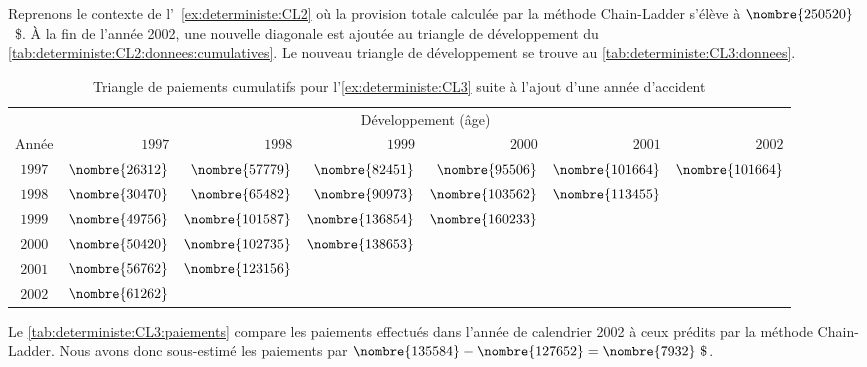 \begin{exemple}
  \label{ex:deterministe:CL3}
  Reprenons le contexte de l'~\autoref{ex:deterministe:CL2} où la
  provision totale calculée par la méthode Chain-Ladder s'élève à
  $\nombre{250520}$~\$. À la fin de l'année 2002, une nouvelle
  diagonale est ajoutée au triangle de développement du
  \autoref{tab:deterministe:CL2:donnees:cumulatives}. Le nouveau
  triangle de développement se trouve au
  \autoref{tab:deterministe:CL3:donnees}.

  \begin{table}
    \centering
    \caption{Triangle de paiements cumulatifs pour
      l'\autoref{ex:deterministe:CL3} suite à l'ajout d'une année
      d'accident}
    \label{tab:deterministe:CL3:donnees}
    \begin{tabular}{crrrrrr}
      \toprule
      & \multicolumn{6}{c}{Développement (âge)} \\
      Année & $1997$ & $1998$ & $1999$ & $2000$ & $2001$ & $2002$ \\
      \midrule
      $1997$ & $\nombre{26312}$ & $\nombre{57779}$  & $\nombre{82451}$ & $\nombre{95506}$ & $\nombre{101664}$ & $\nombre{101664}$ \\
      $1998$ & $\nombre{30470}$ & $\nombre{65482}$  & $\nombre{90973}$ & $\nombre{103562}$ & $\nombre{113455}$ \\
      $1999$ & $\nombre{49756}$ & $\nombre{101587}$ & $\nombre{136854}$	& $\nombre{160233}$ \\
      $2000$ & $\nombre{50420}$ & $\nombre{102735}$ & $\nombre{138653}$ \\
      $2001$ & $\nombre{56762}$ & $\nombre{123156}$ \\
      $2002$ & $\nombre{61262}$ \\
      \bottomrule
    \end{tabular}
  \end{table}

  Le \autoref{tab:deterministe:CL3:paiements} compare les paiements
  effectués dans l'année de calendrier 2002 à ceux prédits par la
  méthode Chain-Ladder. Nous avons donc sous-estimé les paiements par
  $\nombre{135584} - \nombre{127652} = \nombre{7932}~\$$.


\end{exemple}
